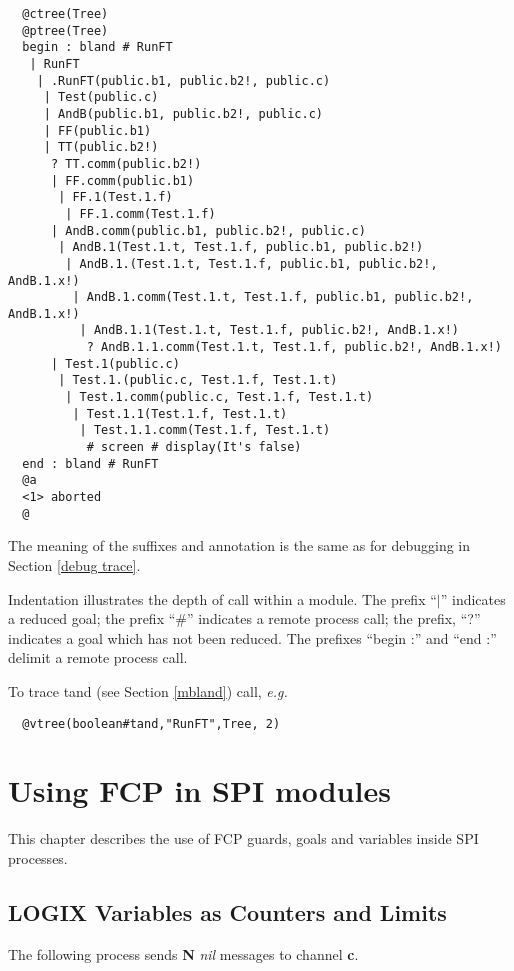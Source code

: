 \begin{verbatim}
  @ctree(Tree)
  @ptree(Tree)
  begin : bland # RunFT
   | RunFT
    | .RunFT(public.b1, public.b2!, public.c)
     | Test(public.c)
     | AndB(public.b1, public.b2!, public.c)
     | FF(public.b1)
     | TT(public.b2!)
      ? TT.comm(public.b2!)
      | FF.comm(public.b1)
       | FF.1(Test.1.f)
        | FF.1.comm(Test.1.f)
      | AndB.comm(public.b1, public.b2!, public.c)
       | AndB.1(Test.1.t, Test.1.f, public.b1, public.b2!)
        | AndB.1.(Test.1.t, Test.1.f, public.b1, public.b2!, AndB.1.x!)
         | AndB.1.comm(Test.1.t, Test.1.f, public.b1, public.b2!, AndB.1.x!)
          | AndB.1.1(Test.1.t, Test.1.f, public.b2!, AndB.1.x!)
           ? AndB.1.1.comm(Test.1.t, Test.1.f, public.b2!, AndB.1.x!)
      | Test.1(public.c)
       | Test.1.(public.c, Test.1.f, Test.1.t)
        | Test.1.comm(public.c, Test.1.f, Test.1.t)
         | Test.1.1(Test.1.f, Test.1.t)
          | Test.1.1.comm(Test.1.f, Test.1.t)
           # screen # display(It's false)
  end : bland # RunFT
  @a
  <1> aborted
  @
\end{verbatim}

\noindent
The meaning of the suffixes and annotation is the same as for
debugging in Section \ref{debug trace}.

\noindent
Indentation illustrates the depth of call within a module.
The prefix ``$|$'' indicates a reduced goal; the prefix
``\#'' indicates a remote process call; the prefix,
``?''  indicates a goal which has not been reduced.  The
prefixes ``begin :'' and ``end :'' delimit a remote process
call.

\noindent
To trace tand (see Section \ref{mbland}) call, {\em e.g.}

\begin{verbatim}
  @vtree(boolean#tand,"RunFT",Tree, 2)
\end{verbatim}

\chapter{Using FCP in SPI modules}
\label{usingFCP}

This chapter describes the use of FCP guards, goals and
variables inside SPI processes.

\section{LOGIX Variables as Counters and Limits}
The following process sends {\bf N} {\em nil} messages to channel {\bf c}.

